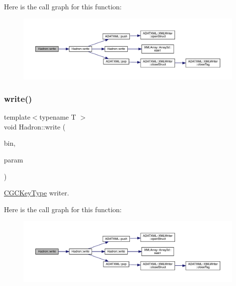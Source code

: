 Here is the call graph for this function\+:\nopagebreak
\begin{figure}[H]
\begin{center}
\leavevmode
\includegraphics[width=350pt]{d1/daf/namespaceHadron_a0051134178fb8346e89720a478b8a8f1_cgraph}
\end{center}
\end{figure}
\mbox{\label{namespaceHadron_aa23076bfdc2f1ebd99330197de102a6d}} 
\subsubsection{\texorpdfstring{write()}{write()}\hspace{0.1cm}{\footnotesize\ttfamily [9/95]}}
{\footnotesize\ttfamily template$<$typename T $>$ \\
void Hadron\+::write (\begin{DoxyParamCaption}\item[{\mbox{\hyperlink{classADATIO_1_1BinaryWriter}{Binary\+Writer}} \&}]{bin,  }\item[{const \mbox{\hyperlink{structHadron_1_1CGCKeyType}{C\+G\+C\+Key\+Type}}$<$ T $>$ \&}]{param }\end{DoxyParamCaption})\hspace{0.3cm}{\ttfamily [inline]}}



\mbox{\hyperlink{structHadron_1_1CGCKeyType}{C\+G\+C\+Key\+Type}} writer. 

Here is the call graph for this function\+:\nopagebreak
\begin{figure}[H]
\begin{center}
\leavevmode
\includegraphics[width=350pt]{d1/daf/namespaceHadron_aa23076bfdc2f1ebd99330197de102a6d_cgraph}
\end{center}
\end{figure}
\mbox{\label{namespaceHadron_a4d280edd65eda86698eae0d619c81a47}} 
